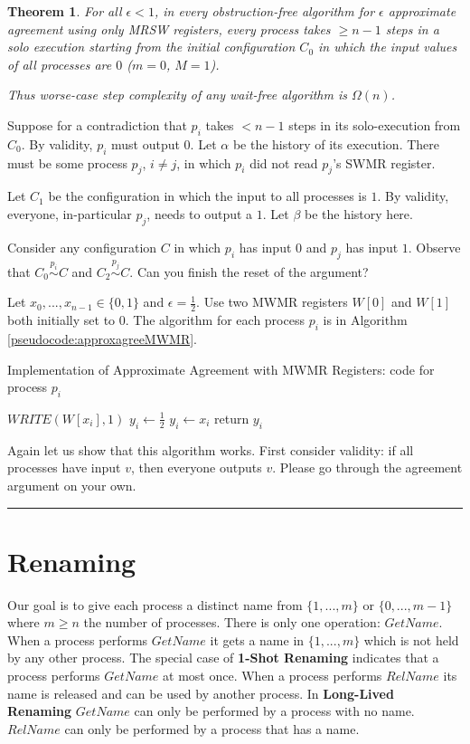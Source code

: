 \documentclass[twoside]{article}
\newcounter{lecnum}
\newtheorem{theorem}{Theorem}[lecnum]
\newenvironment{proof}{{\bf Proof:}}{\hfill\rule{2mm}{2mm}}
\begin{document}
\begin{theorem}
For all $\epsilon < 1$, in every obstruction-free algorithm for $\epsilon$ approximate agreement using only MRSW registers, every process takes $\geq n-1$ steps in a solo execution starting from the initial configuration $C_0$ in which the input values of all processes are $0$ ($m = 0$, $M = 1$). 

Thus worse-case step complexity of any wait-free algorithm is $\Omega(n)$.
\end{theorem}
\begin{proof}
Suppose for a contradiction that $p_i$ takes $< n-1$ steps in its solo-execution from $C_0$. By validity, $p_i$ must output $0$. Let $\alpha$ be the history of its execution. There must be some process $p_j$, $i\neq j$, in which $p_i$ did not read $p_j$'s SWMR register. 

Let $C_1$ be the configuration in which the input to all processes is $1$. By validity, everyone, in-particular $p_j$, needs to output a $1$. Let $\beta$ be the history here.

Consider any configuration $C$ in which $p_i$ has input $0$ and $p_j$ has input $1$. Observe that $C_0 \stackrel{p_i}{\sim} C$ and $C_2 \stackrel{p_j}{\sim} C$. Can you finish the reset of the argument?

Let $x_0, ..., x_{n-1} \in \{0,1\}$ and $\epsilon = \frac{1}{2}$. Use two MWMR registers $W[0]$ and $W[1]$ both initially set to $0$. The algorithm for each process $p_i$ is in Algorithm \ref{pseudocode:approxagreeMWMR}.
\begin{algorithm}
	\caption{Implementation of Approximate Agreement with MWMR Registers: code for process $p_i$}
    \label{pseudocode:approxagreeMWMR}
    \begin{algorithmic}[1]
	\State $WRITE(W[x_i], 1)$
		\State $y_i \leftarrow \frac{1}{2}$
	\Else
		\State $y_i \leftarrow x_i$
	\EndIf
	\State return $y_i$
	\end{algorithmic}
\end{algorithm} 

Again let us show that this algorithm works. First consider validity: if all processes have input $v$, then everyone outputs $v$. Please go through the agreement argument on your own.  
\end{proof}

\section{Renaming}
Our goal is to give each process a distinct name from $\{1, ..., m\}$ or $\{0, ..., m-1\}$ where $m \geq n$ the number of processes. There is only one operation: $GetName$. When a process performs $GetName$ it gets a name in $\{1, ..., m\}$ which is not held by any other process. The special case of \textbf{1-Shot Renaming} indicates that a process performs $GetName$ at most once. When a process performs $RelName$ its name is released and can be used by another process. In \textbf{Long-Lived Renaming} $GetName$ can only be performed by a process with no name. $RelName$ can only be performed by a process that has a name.
\end{document}
